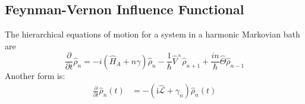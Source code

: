 \documentclass[9pt]{report}
\begin{document}
\subsection{Feynman-Vernon Influence Functional}





The hierarchical equations of motion for a system in a harmonic Markovian bath are
\begin{equation}
\frac{\partial}{\partial t}\hat{\rho}_{n}=-i(\hat{H}_{A}+n\gamma)\hat{\rho}_{n}-\frac{1}{\hbar}\hat{V}^{\times}\hat{\rho}_{n+1}+\frac{in}{\hbar}\hat{\Theta}\hat{\rho}_{n-1}
\end{equation}
Another form is:
\begin{align}
\frac{\partial}{\partial t}\hat{\rho}_{n}(t) &= -(\mathrm{i}\hat{\mathcal{L}}+\gamma_n)\hat{\rho}_{n}(t)
\end{align}
\end{document}
